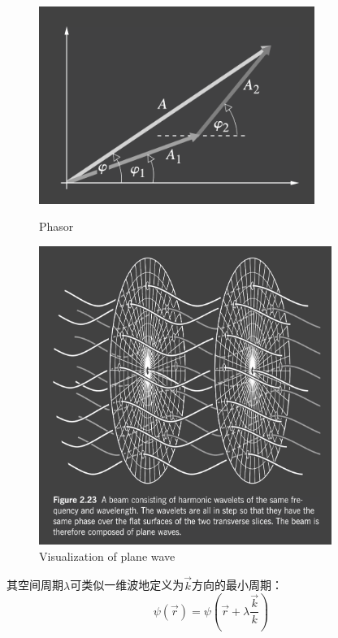 \documentclass[12pt]{ctexart}%
\begin{document}
\begin{figure}
    \begin{minipage}{0.6\linewidth}
        \centering
        \includegraphics[width=0.8\textwidth]{Image/1_phasor.png}
        \caption{Phasor}
        \label{phasor}
    \end{minipage}
    \begin{minipage}{0.4\linewidth}
        \centering
        \includegraphics[width=0.85\textwidth]{Image/1_plane_wave.png}
        \caption{Visualization of plane wave}
        \label{plane_wave}
    \end{minipage}
   
\end{figure}
其空间周期$\lambda$可类似一维波地定义为$\vec{k}$方向的最小周期：
\begin{equation}
    \psi(\vec{r})=\psi(\vec{r}+\lambda \frac{\vec{k}}{k})
\end{equation}
\end{document}
